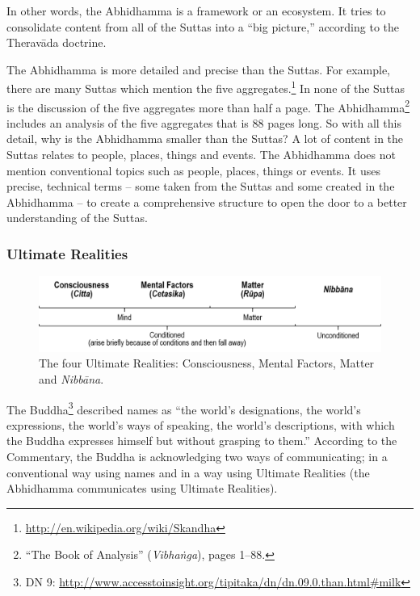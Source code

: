 In other words, the Abhidhamma is a framework or an ecosystem. It tries to consolidate content from all of the Suttas into a “big picture,” according to the Theravāda doctrine.

The Abhidhamma is more detailed and precise than the Suttas. For example, there are many Suttas which mention the five aggregates.\footnote{\url{http://en.wikipedia.org/wiki/Skandha}} In none of the Suttas is the discussion of the five aggregates more than half a page. The Abhidhamma\footnote{“The Book of Analysis” (\textit{Vibhaṅga}), pages 1--88.} includes an analysis of the five aggregates that is 88 pages long. So with all this detail, why is the Abhidhamma smaller than the Suttas? A lot of content in the Suttas relates to people, places, things and events. The Abhidhamma does not mention conventional topics such as people, places, things or events. It uses precise, technical terms – some taken from the Suttas and some created in the Abhidhamma – to create a comprehensive structure to open the door to a better understanding of the Suttas.

\subsubsection*{Ultimate Realities}

\begin{figure}[h]
\centering
\includegraphics[width=0.9\linewidth]{./Diagrams/Realities}
\caption{The four Ultimate Realities: Consciousness, Mental Factors, Matter and \textit{Nibbāna}.}
\label{fig:Realities}
\end{figure}

The Buddha\footnote{DN 9: \url{http://www.accesstoinsight.org/tipitaka/dn/dn.09.0.than.html\#milk}} described names as “the world’s designations, the world’s expressions, the world’s ways of speaking, the world’s descriptions, with which the Buddha expresses himself but without grasping to them.” According to the Commentary, the Buddha is acknowledging two ways of communicating; in a conventional way using names and in a way using Ultimate Realities (the Abhidhamma communicates using Ultimate Realities).

